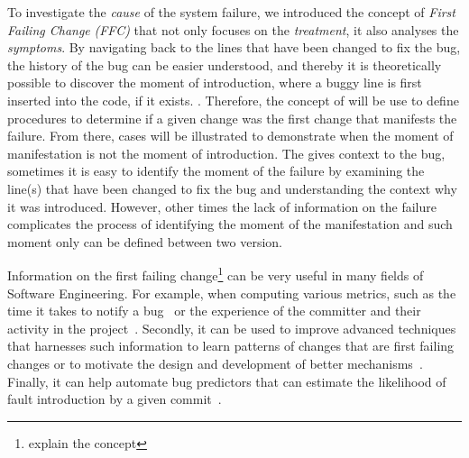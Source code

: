 \documentclass[a4paper, 12pt]{book}
\begin{document}
To investigate the \emph{cause} of the system failure, we introduced the concept of \emph{First Failing Change} \emph{(FFC)} that not only focuses on the \emph{treatment}, it also analyses the \emph{symptoms}. By navigating back to the lines that have been changed to fix the bug, the history of the bug can be easier understood, and thereby it is theoretically possible to discover the moment of introduction, where a buggy line is first inserted into the code, if it exists. . Therefore, the concept of \FFC will be use to define procedures to determine if a given change was the first change that manifests the failure. From there, cases will be illustrated to demonstrate when the moment of manifestation is not the moment of introduction. The \FFC gives context to the bug, sometimes it is easy to identify the moment of the failure by examining the line(s) that have been changed to fix the bug and understanding the context why it was introduced. However, other times the lack of information on the failure complicates the process of identifying the moment of the manifestation and such moment only can be defined between two version. 
  



Information on the first failing change\footnote{explain the concept} can be very useful in many fields of Software Engineering. For example, when computing various metrics, such as the time it takes to notify a bug~\cite{rodriguez2017much} or the experience of the committer and their activity in the project~\cite{izquierdo2011developers,izquierdo2012more}. Secondly, it can be used to improve advanced techniques that harnesses such information to learn patterns of changes that are first failing changes or to motivate the design and development of better mechanisms~\cite{harris2010transactional}. Finally, it can help automate bug predictors that can estimate the likelihood of fault introduction by a given commit~\cite{rao2011retrieval,thung2012extent,zimmermann2007predicting}.
\end{document}
